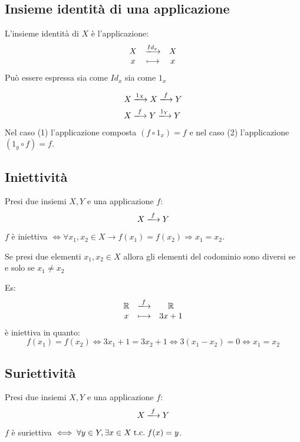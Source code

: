 \documentclass[a4paper,12pt]{article}
\begin{document}
	\subsection{Insieme identità di una applicazione}
	L'insieme identità di $X$ è l'applicazione:
	\[
	\begin{array}{c c c}
		X & \xlongrightarrow{Id_x} & X \\
		x & \longmapsto & x \\
	\end{array}
	\]
	Può essere espressa sia come $Id_x$ sia come $1_x$
	
	\setcounter{equation}{0}
	\begin{align}
		X & \xlongrightarrow{1_X} X \xlongrightarrow{f} Y \\
		X & \xlongrightarrow{f} Y \xlongrightarrow{1_Y} Y
	\end{align}
	Nel caso (1) l'applicazione composta $(f \circ 1_x) = f$ e nel caso (2) l'applicazione $(1_y \circ f) = f$.
	
	\subsection{Iniettività}
	Presi due insiemi $X, Y$ e una applicazione $f$:
	\[
	X \xlongrightarrow{f} Y
	\] 
	
	\begin{center}
		$f$ è iniettiva $\iff \forall x_1,x_2 \in X \rightarrow f(x_1) = f(x_2) \Rightarrow x_1 = x_2$.
	\end{center}
	
	Se presi due elementi $x_1, x_2 \in X$ allora gli elementi del codominio sono diversi se e solo se $x_1 \not = x_2$
	
	Es: 
	\[
	\begin{array}{c c c}
		\mathbb{R} & \xlongrightarrow{f} & \mathbb{R} \\
		x & \longmapsto & 3x + 1\\
	\end{array}
	\]
	è iniettiva in quanto:
	\[
	f(x_1) = f(x_2) \iff 3x_1 + 1 = 3x_2 + 1 \iff 3(x_1 - x_2) = 0 \iff x_1 = x_2
	\]
	
	\subsection{Suriettività}
	Presi due insiemi $X, Y$ e una applicazione $f$:
	\[
	X \xlongrightarrow{f} Y
	\] 
	
	\begin{center}
		$f$ è suriettiva $\iff \forall y \in Y, \exists x\in X \;\text{t.c.}\; f(x) = y$.
	\end{center}
	
\end{document}
